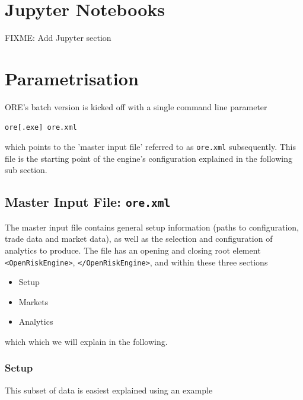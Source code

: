 \documentclass[12pt, a4paper]{article}
\begin{document}
\section{Jupyter Notebooks}

FIXME: Add Jupyter section

\section{Parametrisation}\label{sec:configuration}

ORE's batch version is kicked off with a single command line parameter 

\medskip
\centerline{\tt ore[.exe] ore.xml}
\medskip

which points to the 'master input file' referred to  
as {\tt ore.xml} subsequently. 
This file is the starting point of the engine's configuration explained in the following sub section.

\subsection{Master Input File: {\tt ore.xml}}

The master input file contains general setup information (paths to configuration, trade data and market data), as well as the selection and configuration of  analytics to produce. The file has an opening and closing root element {\tt <OpenRiskEngine>}, {\tt </OpenRiskEngine>}, and within these three sections 
\begin{itemize}
\item Setup
\item Markets
\item Analytics
\end{itemize}
which which we will explain in the following.

\subsubsection*{Setup}

This subset of data is easiest explained using an example
\end{document}
